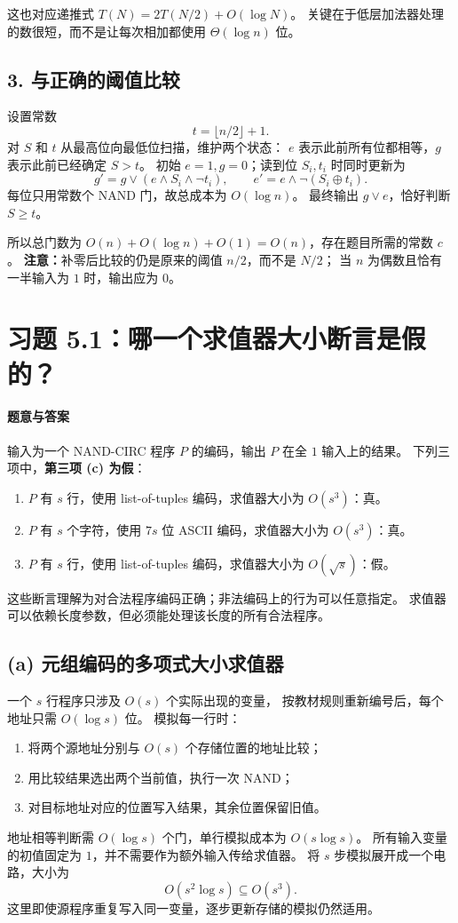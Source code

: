 \documentclass[UTF8,fontset=fandol,11pt,a4paper]{ctexart}
\begin{document}
这也对应递推式 $T(N)=2T(N/2)+O(\log N)$。
关键在于低层加法器处理的数很短，而不是让每次相加都使用 $\Theta(\log n)$ 位。

\subsection*{3. 与正确的阈值比较}
设置常数
\[
 t=\lfloor n/2\rfloor+1.
\]
对 $S$ 和 $t$ 从最高位向最低位扫描，维护两个状态：
$e$ 表示此前所有位都相等，$g$ 表示此前已经确定 $S>t$。
初始 $e=1,g=0$；读到位 $S_i,t_i$ 时同时更新为
\[
 g'=g\lor(e\land S_i\land\neg t_i),\qquad
 e'=e\land\neg(S_i\oplus t_i).
\]
每位只用常数个 NAND 门，故总成本为 $O(\log n)$。
最终输出 $g\lor e$，恰好判断 $S\ge t$。

所以总门数为 $O(n)+O(\log n)+O(1)=O(n)$，存在题目所需的常数 $c$。
\textbf{注意：}补零后比较的仍是原来的阈值 $n/2$，而不是 $N/2$；
当 $n$ 为偶数且恰有一半输入为 $1$ 时，输出应为 $0$。

\section{习题 5.1：哪一个求值器大小断言是假的？}

\paragraph{题意与答案}
输入为一个 NAND-CIRC 程序 $P$ 的编码，输出 $P$ 在全 $1$ 输入上的结果。
下列三项中，\textbf{第三项 (c) 为假}：
\begin{enumerate}[label=(\alph*)]
 \item $P$ 有 $s$ 行，使用 list-of-tuples 编码，求值器大小为 $O(s^3)$：真。
 \item $P$ 有 $s$ 个字符，使用 $7s$ 位 ASCII 编码，求值器大小为 $O(s^3)$：真。
 \item $P$ 有 $s$ 行，使用 list-of-tuples 编码，求值器大小为 $O(\sqrt s)$：假。
\end{enumerate}
这些断言理解为对合法程序编码正确；非法编码上的行为可以任意指定。
求值器可以依赖长度参数，但必须能处理该长度的所有合法程序。

\subsection*{(a) 元组编码的多项式大小求值器}
一个 $s$ 行程序只涉及 $O(s)$ 个实际出现的变量，
按教材规则重新编号后，每个地址只需 $O(\log s)$ 位。
模拟每一行时：
\begin{enumerate}
 \item 将两个源地址分别与 $O(s)$ 个存储位置的地址比较；
 \item 用比较结果选出两个当前值，执行一次 NAND；
 \item 对目标地址对应的位置写入结果，其余位置保留旧值。
\end{enumerate}
地址相等判断需 $O(\log s)$ 个门，单行模拟成本为 $O(s\log s)$。
所有输入变量的初值固定为 $1$，并不需要作为额外输入传给求值器。
将 $s$ 步模拟展开成一个电路，大小为
\[
 O(s^2\log s)\subseteq O(s^3).
\]
这里即使源程序重复写入同一变量，逐步更新存储的模拟仍然适用。
\end{document}
